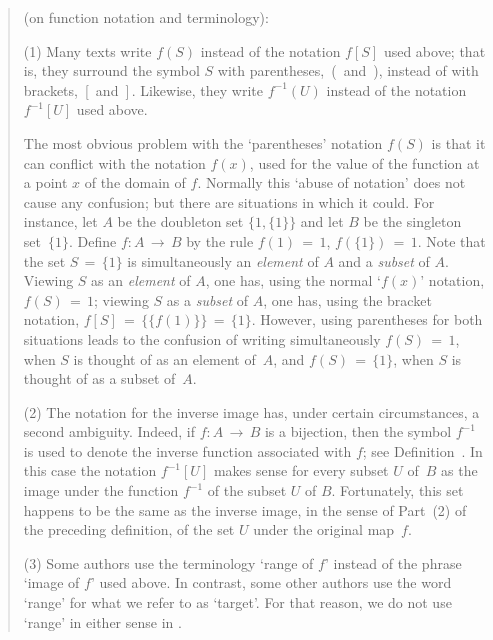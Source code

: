 \begin{quotation}
{\footnotesize \underline{\Notes} (on function notation and terminology):

\V

        (1) Many texts write $f(S)$ instead of the notation $f[S]$ used above;
    that is, they surround the symbol $S$ with parentheses,~(\, and~), instead of with brackets,~[\, and~]\,.
    Likewise, they write $f^{-1}(U)$ instead of the notation $f^{-1}[U]$ used above.

        The most obvious problem with the `parentheses' notation $f(S)$ is that it can conflict with the notation $f(x)$,
    used for the value of the function at a point $x$ of the domain of $f$. Normally this `abuse of notation' does not cause any confusion;
    but there are situations in which it could. For instance, let $A$ be the doubleton set $\{1,\{1\}\}$ and let $B$ be the singleton set~$\{1\}$.
    Define $f:A \,{\rightarrow}\, B$ by the rule $f(1) \,=\, 1$, $f(\{1\}) \,=\, 1$.
    Note that the set $S \,=\, \{1\}$ is simultaneously an {\em element} of $A$ and a {\em subset} of $A$.
    Viewing $S$ as an {\em element} of $A$, one has, using the normal `$f(x)$' notation, $f(S) \,=\, 1$; viewing $S$ as a {\em subset} of $A$, one has,
    using the bracket notation, $f[S] \,=\, \{\{f(1)\}\} \,=\, \{1\}$.
    However, using parentheses for both situations leads to the confusion of writing simultaneously
    $f(S) \,=\, 1$, when $S$ is thought of as an element of~$A$, and $f(S) \,=\, \{1\}$, when $S$ is thought of as a subset of~$A$.

\V

        (2) The notation for the inverse image has, under certain circumstances, a second ambiguity.
    Indeed, if $f:A \,{\rightarrow}\, B$ is a bijection, then the symbol $f^{-1}$
    is used to denote the inverse function associated with $f$; see Definition~.
    In this case the notation $f^{-1}[U]$ makes sense for every subset $U$ of~$B$ as the image under the function $f^{-1}$ of the subset $U$ of $B$.
    Fortunately, this set happens to be the same as the inverse image, in the sense of Part~(2) of the preceding definition,
    of the set $U$ under the original map~$f$.

\V

        (3) Some authors use the terminology `range of $f$' instead of the phrase `image of $f$' used above.
    In contrast, some other authors use the word `range' for what we refer to as `target'. For that reason, we do not use `range' in either sense in {\ThisText}.
}%
\end{quotation} 

